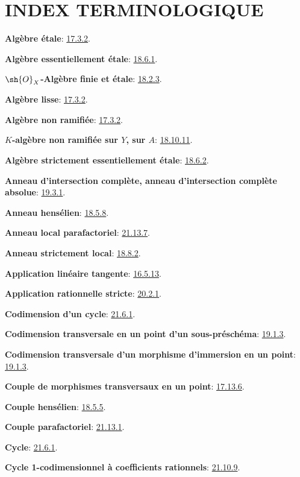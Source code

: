 \clearpage
{}
{}
\section*{INDEX TERMINOLOGIQUE}

\begingroup
\small
\setlength{\parindent}{0pt}
\setlength{\parskip}{2pt}
\newcommand{\EGAIVterm}[2]{\textbf{#1}: #2.\par}
\newcommand{\EGAIVidxref}[1]{\hyperref[IV.#1]{#1}}

\EGAIVterm{Algèbre étale}{{\hyperlink{ega4.c04.subsec.17-3-2}{17.3.2}}}
\EGAIVterm{Algèbre essentiellement étale}{{\hyperlink{ega4.c04.statement.18-6-1}{18.6.1}}}
\EGAIVterm{$\sh{O}_X$-Algèbre finie et étale}{{\hyperlink{ega4.c04.prop.18-2-3}{18.2.3}}}
\EGAIVterm{Algèbre lisse}{{\hyperlink{ega4.c04.subsec.17-3-2}{17.3.2}}}
\EGAIVterm{Algèbre non ramifiée}{{\hyperlink{ega4.c04.subsec.17-3-2}{17.3.2}}}
\EGAIVterm{$K$-algèbre non ramifiée sur $Y$, sur $A$}{{\hyperlink{ega4.c04.rem.18-10-11}{18.10.11}}}
\EGAIVterm{Algèbre strictement essentiellement étale}{{\hyperlink{ega4.c04.lem.18-6-2}{18.6.2}}}
\EGAIVterm{Anneau d'intersection complète, anneau d'intersection complète absolue}{{\hyperlink{ega4.c04.def.19-3-1}{19.3.1}}}
\EGAIVterm{Anneau hensélien}{{\hyperlink{ega4.c04.def.18-5-8}{18.5.8}}}
\EGAIVterm{Anneau local parafactoriel}{{\hyperlink{ega4.c04.def.21-13-7}{21.13.7}}}
\EGAIVterm{Anneau strictement local}{{\hyperlink{ega4.c04.def.18-8-2}{18.8.2}}}
\EGAIVterm{Application linéaire tangente}{{\hyperlink{ega4.c04.statement.16-5-13}{16.5.13}}}
\EGAIVterm{Application rationnelle stricte}{{\hyperlink{ega4.c04.statement.20-2-1}{20.2.1}}}
\EGAIVterm{Codimension d'un cycle}{{\hyperlink{ega4.c04.statement.21-6-1}{21.6.1}}}
\EGAIVterm{Codimension transversale en un point d'un sous-préschéma}{{\hyperlink{ega4.c04.def.19-1-3}{19.1.3}}}
\EGAIVterm{Codimension transversale d'un morphisme d'immersion en un point}{{\hyperlink{ega4.c04.def.19-1-3}{19.1.3}}}
\EGAIVterm{Couple de morphismes transversaux en un point}{{\hyperlink{ega4.c04.cor.17-13-6}{17.13.6}}}
\EGAIVterm{Couple hensélien}{{\hyperlink{ega4.c04.def.18-5-5}{18.5.5}}}
\EGAIVterm{Couple parafactoriel}{{\hyperlink{ega4.c04.def.21-13-1}{21.13.1}}}
\EGAIVterm{Cycle}{{\hyperlink{ega4.c04.statement.21-6-1}{21.6.1}}}
\EGAIVterm{Cycle 1-codimensionnel à coefficients rationnels}{{\hyperlink{ega4.c04.statement.21-10-9}{21.10.9}}}
